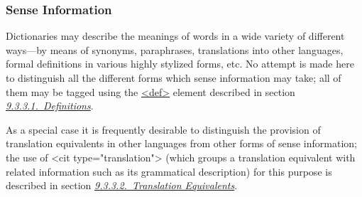 \subsubsection[{Sense Information}]{Sense Information}\label{DITPSE}\par
Dictionaries may describe the meanings of words in a wide variety of different ways—by means of synonyms, paraphrases, translations into other languages, formal definitions in various highly stylized forms, etc. No attempt is made here to distinguish all the different forms which sense information may take; all of them may be tagged using the \hyperref[TEI.def]{<def>} element described in section \textit{\hyperref[DITPDE]{9.3.3.1.\ Definitions}}.\par
As a special case it is frequently desirable to distinguish the provision of translation equivalents in other languages from other forms of sense information; the use of <cit type="translation"> (which groups a translation equivalent with related information such as its grammatical description) for this purpose is described in section \textit{\hyperref[DITPTR]{9.3.3.2.\ Translation Equivalents}}.
